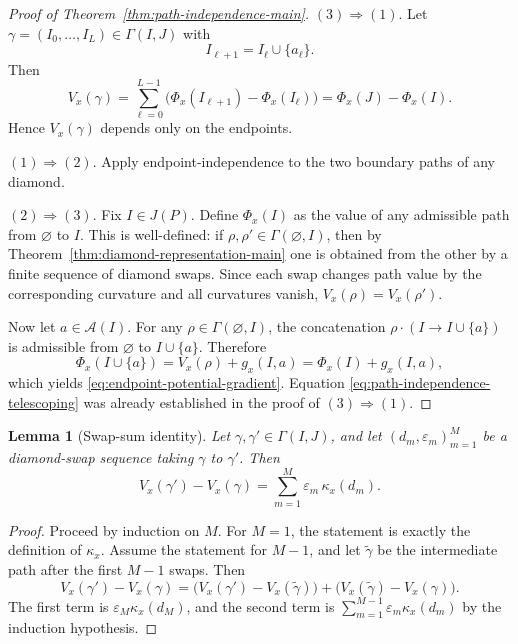 \documentclass{article}
\newtheorem{lemma}[theorem]{Lemma}
\theoremstyle{definition}
\begin{document}
\begin{proof}[Proof of Theorem~\ref{thm:path-independence-main}]
{\((3)\Rightarrow(1)\).}
Let \(\gamma=(I_0,\dots,I_L)\in \Gamma(I,J)\) with
\[
I_{\ell+1}=I_\ell\cup\{a_\ell\}.
\]
Then
\[
V_x(\gamma)
=
\sum_{\ell=0}^{L-1}\bigl(\Phi_x(I_{\ell+1})-\Phi_x(I_\ell)\bigr)
=
\Phi_x(J)-\Phi_x(I).
\]
Hence \(V_x(\gamma)\) depends only on the endpoints.

\smallskip
{\((1)\Rightarrow(2)\).}
Apply endpoint-independence to the two boundary paths of any diamond.

\smallskip
{\((2)\Rightarrow(3)\).}
Fix \(I\in J(P)\). Define \(\Phi_x(I)\) as the value of any admissible path from \(\varnothing\) to \(I\). This is well-defined: if \(\rho,\rho'\in \Gamma(\varnothing,I)\), then by Theorem~\ref{thm:diamond-representation-main} one is obtained from the other by a finite sequence of diamond swaps. Since each swap changes path value by the corresponding curvature and all curvatures vanish, \(V_x(\rho)=V_x(\rho')\).

Now let \(a\in \mathcal A(I)\). For any \(\rho\in \Gamma(\varnothing,I)\), the concatenation \(\rho\cdot (I\to I\cup\{a\})\) is admissible from \(\varnothing\) to \(I\cup\{a\}\). Therefore
\[
\Phi_x(I\cup\{a\})
=
V_x(\rho)+g_x(I,a)
=
\Phi_x(I)+g_x(I,a),
\]
which yields \eqref{eq:endpoint-potential-gradient}. Equation \eqref{eq:path-independence-telescoping} was already established in the proof of \((3)\Rightarrow(1)\).
\end{proof}

\begin{lemma}[Swap-sum identity]
\label{lem:swap-sum-app}
Let \(\gamma,\gamma'\in \Gamma(I,J)\), and let \((d_m,\varepsilon_m)_{m=1}^M\) be a diamond-swap sequence taking \(\gamma\) to \(\gamma'\). Then
\begin{equation}
V_x(\gamma')-V_x(\gamma)=\sum_{m=1}^M \varepsilon_m\,\kappa_x(d_m).
\label{eq:swap-sum-identity}
\end{equation}
\end{lemma}

\begin{proof}
Proceed by induction on \(M\). For \(M=1\), the statement is exactly the definition of \(\kappa_x\). Assume the statement for \(M-1\), and let \(\tilde\gamma\) be the intermediate path after the first \(M-1\) swaps. Then
\[
V_x(\gamma')-V_x(\gamma)
=
\bigl(V_x(\gamma')-V_x(\tilde\gamma)\bigr)
+
\bigl(V_x(\tilde\gamma)-V_x(\gamma)\bigr).
\]
The first term is \(\varepsilon_M\kappa_x(d_M)\), and the second term is \(\sum_{m=1}^{M-1}\varepsilon_m\kappa_x(d_m)\) by the induction hypothesis.
\end{proof}
\end{document}
